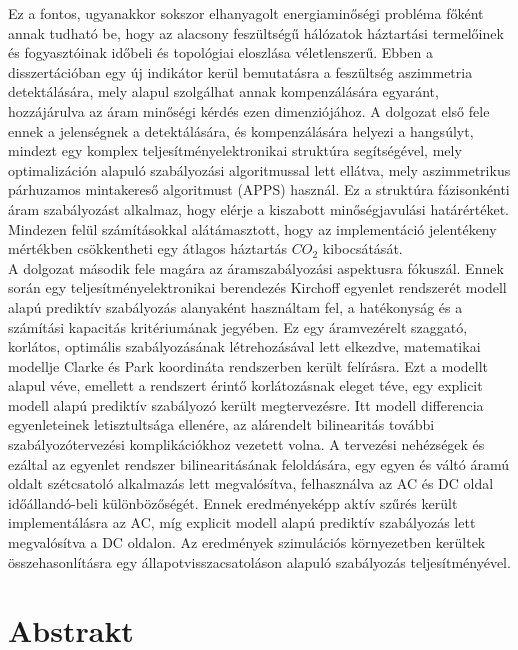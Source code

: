 Ez a fontos, ugyanakkor sokszor elhanyagolt energiaminőségi probléma főként annak tudható be, hogy az alacsony feszültségű hálózatok háztartási termelőinek és fogyasztóinak időbeli és topológiai eloszlása véletlenszerű. Ebben a disszertációban egy új indikátor kerül bemutatásra a feszültség aszimmetria detektálására, mely alapul szolgálhat annak kompenzálására egyaránt, hozzájárulva az áram minőségi kérdés ezen dimenziójához. A dolgozat első fele ennek a jelenségnek a detektálására, és kompenzálására helyezi a hangsúlyt, mindezt egy komplex teljesítményelektronikai struktúra segítségével, mely optimalizáción alapuló szabályozási algoritmussal lett ellátva, mely aszimmetrikus párhuzamos mintakereső algoritmust (APPS) használ. Ez a struktúra fázisonkénti áram szabályozást alkalmaz, hogy elérje a kiszabott minőségjavulási határértéket. Mindezen felül  számításokkal alátámasztott, hogy az implementáció jelentékeny mértékben csökkentheti egy átlagos háztartás $CO_2$ kibocsátását.\\
A dolgozat második fele magára az áramszabályozási aspektusra fókuszál. Ennek során egy teljesítményelektronikai berendezés Kirchoff egyenlet rendszerét modell alapú prediktív szabályozás alanyaként használtam fel, a hatékonyság és a számítási kapacitás kritériumának jegyében. Ez egy áramvezérelt szaggató, korlátos, optimális szabályozásának létrehozásával lett elkezdve, matematikai modellje Clarke és Park koordináta rendszerben került felírásra. Ezt a modellt alapul véve, emellett a rendszert érintő korlátozásnak eleget téve, egy explicit modell alapú prediktív szabályozó került megtervezésre. Itt modell differencia egyenleteinek letisztultsága ellenére, az alárendelt bilinearitás további szabályozótervezési komplikációkhoz vezetett volna. A tervezési nehézségek és ezáltal az egyenlet rendszer bilinearitásának feloldására, egy egyen és váltó áramú oldalt szétcsatoló alkalmazás lett megvalósítva, felhasználva az AC és DC oldal időállandó-beli különbözőségét. Ennek eredményeképp aktív szűrés került implementálásra az AC, míg explicit modell alapú prediktív szabályozás lett megvalósítva a DC oldalon. Az eredmények szimulációs környezetben kerültek összehasonlításra egy állapotvisszacsatoláson alapuló szabályozás teljesítményével.

\chapter*{Abstrakt}
\thispagestyle{plain}



